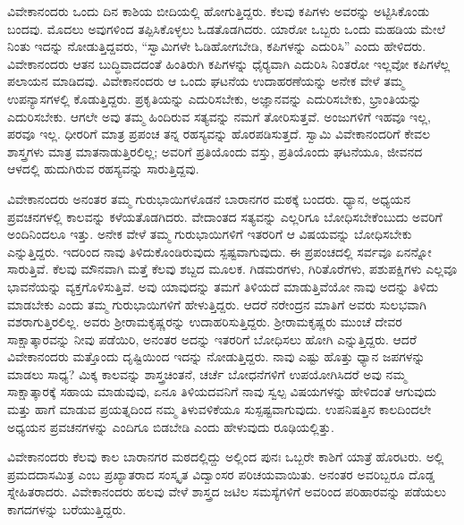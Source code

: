  ವಿವೇಕಾನಂದರು ಒಂದು ದಿನ ಕಾಶಿಯ ಬೀದಿಯಲ್ಲಿ ಹೋಗುತ್ತಿದ್ದರು. ಕೆಲವು ಕಪಿಗಳು ಅವರನ್ನು ಅಟ್ಟಿಸಿಕೊಂಡು ಬಂದವು. ಮೊದಲು ಅವುಗಳಿಂದ ತಪ್ಪಿಸಿಕೊಳ್ಳಲು ಓಡತೊಡಗಿದರು. ಯಾರೋ ಒಬ್ಬರು ಒಂದು ಮಹಡಿಯ ಮೇಲೆ ನಿಂತು ಇದನ್ನು ನೋಡುತ್ತಿದ್ದವರು, “ಸ್ವಾಮಿಗಳೇ ಓಡಿಹೋಗಬೇಡಿ, ಕಪಿಗಳನ್ನು ಎದುರಿಸಿ” ಎಂದು ಹೇಳಿದರು. ವಿವೇಕಾನಂದರು ಆತನ ಬುದ್ಧಿವಾದದಂತೆ ಹಿಂತಿರುಗಿ ಕಪಿಗಳನ್ನು ಧೈರ‍್ಯವಾಗಿ ಎದುರಿಸಿ ನಿಂತರೋ ಇಲ್ಲವೋ ಕಪಿಗಳೆಲ್ಲ ಪಲಾಯನ ಮಾಡಿದವು. ವಿವೇಕಾನಂದರು ಆ ಒಂದು ಘಟನೆಯ ಉದಾಹರಣೆಯನ್ನು ಅನೇಕ ವೇಳೆ ತಮ್ಮ ಉಪನ್ಯಾಸಗಳಲ್ಲಿ ಕೊಡುತ್ತಿದ್ದರು. ಪ್ರಕೃತಿಯನ್ನು ಎದುರಿಸಬೇಕು, ಅಜ್ಞಾನವನ್ನು ಎದುರಿಸಬೇಕು, ಭ್ರಾಂತಿಯನ್ನು ಎದುರಿಸಬೇಕು. ಆಗಲೇ ಅವು ತಮ್ಮ ಹಿಂದಿರುವ ಸತ್ಯವನ್ನು ನಮಗೆ ತೋರಿಸುತ್ತವೆ. ಅಂಜುಗಳಿಗೆ ಇಹವೂ ಇಲ್ಲ, ಪರವೂ ಇಲ್ಲ. ಧೀರರಿಗೆ ಮಾತ್ರ ಪ್ರಪಂಚ ತನ್ನ ರಹಸ್ಯವನ್ನು ಹೊರಪಡಿಸುತ್ತದೆ. ಸ್ವಾಮಿ ವಿವೇಕಾನಂದರಿಗೆ ಕೇವಲ ಶಾಸ್ತ್ರಗಳು ಮಾತ್ರ ಮಾತನಾಡುತ್ತಿರಲಿಲ್ಲ; ಅವರಿಗೆ ಪ್ರತಿಯೊಂದು ವಸ್ತು, ಪ್ರತಿಯೊಂದು ಘಟನೆಯೂ, ಜೀವನದ ಆಳದಲ್ಲಿ ಹುದುಗಿರುವ ರಹಸ್ಯವನ್ನು ಸಾರುತ್ತಿದ್ದವು. 

 ವಿವೇಕಾನಂದರು ಅನಂತರ ತಮ್ಮ ಗುರುಭಾಯಿಗಳೊಡನೆ ಬಾರಾನಗರ ಮಠಕ್ಕೆ ಬಂದರು. ಧ್ಯಾನ, ಅಧ್ಯಯನ ಪ್ರವಚನಗಳಲ್ಲಿ ಕಾಲವನ್ನು ಕಳೆಯತೊಡಗಿದರು. ವೇದಾಂತದ ಸತ್ಯವನ್ನು ಎಲ್ಲರಿಗೂ ಬೋಧಿಸಬೇಕೆಂಬುದು ಅವರಿಗೆ ಅಂದಿನಿಂದಲೂ ಇತ್ತು. ಅನೇಕ ವೇಳೆ ತಮ್ಮ ಗುರುಭಾಯಿಗಳಿಗೆ ಇತರರಿಗೆ ಆ ವಿಷಯವನ್ನು ಬೋಧಿಸಬೇಕು ಎನ್ನುತ್ತಿದ್ದರು. ಇದರಿಂದ ನಾವು ತಿಳಿದುಕೊಂಡಿರುವುದು ಸ್ಪಷ್ಟವಾಗುವುದು. ಈ ಪ್ರಪಂಚದಲ್ಲಿ ಸರ್ವವೂ ಏನನ್ನೋ ಸಾರುತ್ತಿವೆ. ಕೆಲವು ಮೌನವಾಗಿ ಮತ್ತೆ ಕೆಲವು ಶಬ್ದದ ಮೂಲಕ. ಗಿಡಮರಗಳು, ಗಿರಿತೊರೆಗಳು, ಪಶುಪಕ್ಷಿಗಳು ಎಲ್ಲವೂ ಭಾವನೆಯನ್ನು ವ್ಯಕ್ತಗೊಳಿಸುತ್ತಿವೆ. ಅವು ಯಾವುದನ್ನು ತಮಗೆ ತಿಳಿಯದೆ ಮಾಡುತ್ತಿವೆಯೋ ನಾವು ಅದನ್ನು ತಿಳಿದು ಮಾಡಬೇಕು ಎಂದು ತಮ್ಮ ಗುರುಭಾಯಿಗಳಿಗೆ ಹೇಳುತ್ತಿದ್ದರು. ಆದರೆ ನರೇಂದ್ರನ ಮಾತಿಗೆ ಅವರು ಸುಲಭವಾಗಿ ವಶರಾಗುತ್ತಿರಲಿಲ್ಲ. ಅವರು ಶ‍್ರೀರಾಮಕೃಷ್ಣರನ್ನು ಉದಾಹರಿಸುತ್ತಿದ್ದರು. ಶ‍್ರೀರಾಮಕೃಷ್ಣರು ಮುಂಚೆ ದೇವರ ಸಾಕ್ಷಾತ್ಕಾರವನ್ನು ನೀವು ಪಡೆಯಿರಿ, ಅನಂತರ ಅದನ್ನು ಇತರರಿಗೆ ಬೋಧಿಸಲು ಹೋಗಿ ಎನ್ನುತ್ತಿದ್ದರು. ಆದರೆ ವಿವೇಕಾನಂದರು ಮತ್ತೊಂದು ದೃಷ್ಟಿಯಿಂದ ಇದನ್ನು ನೋಡುತ್ತಿದ್ದರು. ನಾವು ಎಷ್ಟು ಹೊತ್ತು ಧ್ಯಾನ ಜಪಗಳನ್ನು ಮಾಡಲು ಸಾಧ್ಯ? ಮಿಕ್ಕ ಕಾಲವನ್ನು ಶಾಸ್ತ್ರಚಿಂತನೆ, ಚರ್ಚೆ ಬೋಧನೆಗಳಿಗೆ ಉಪಯೋಗಿಸಿದರೆ ಅವು ನಮ್ಮ ಸಾಕ್ಷಾತ್ಕಾರಕ್ಕೆ ಸಹಾಯ ಮಾಡುವುವು, ಏನೂ ತಿಳಿಯದವನಿಗೆ ನಾವು ಸ್ವಲ್ಪ ವಿಷಯಗಳನ್ನು ಹೇಳಿದಂತೆ ಆಗುವುದು ಮತ್ತು ಹಾಗೆ ಮಾಡುವ ಪ್ರಯತ್ನದಿಂದ ನಮ್ಮ ತಿಳುವಳಿಕೆಯೂ ಸುಸ್ಪಷ್ಟವಾಗುವುದು. ಉಪನಿಷತ್ತಿನ ಕಾಲದಿಂದಲೇ ಅಧ್ಯಯನ ಪ್ರವಚನಗಳನ್ನು ಎಂದಿಗೂ ಬಿಡಬೇಡಿ ಎಂದು ಹೇಳುವುದು ರೂಢಿಯಲ್ಲಿತ್ತು. 

 ವಿವೇಕಾನಂದರು ಕೆಲವು ಕಾಲ ಬಾರಾನಗರ ಮಠದಲ್ಲಿದ್ದು ಅಲ್ಲಿಂದ ಪುನಃ ಒಬ್ಬರೇ ಕಾಶಿಗೆ ಯಾತ್ರೆ ಹೊರಟರು. ಅಲ್ಲಿ ಪ್ರಮದದಾಸಮಿತ್ರ ಎಂಬ ಪ್ರಖ್ಯಾತರಾದ ಸಂಸ್ಕೃತ ವಿದ್ವಾಂಸರ ಪರಿಚಯವಾಯಿತು. ಅನಂತರ ಅವರಿಬ್ಬರೂ ದೊಡ್ಡ ಸ್ನೇಹಿತರಾದರು. ವಿವೇಕಾನಂದರು ಹಲವು ವೇಳೆ ಶಾಸ್ತ್ರದ ಜಟಿಲ ಸಮಸ್ಯೆಗಳಿಗೆ ಅವರಿಂದ ಪರಿಹಾರವನ್ನು ಪಡೆಯಲು ಕಾಗದಗಳನ್ನು ಬರೆಯುತ್ತಿದ್ದರು. 

